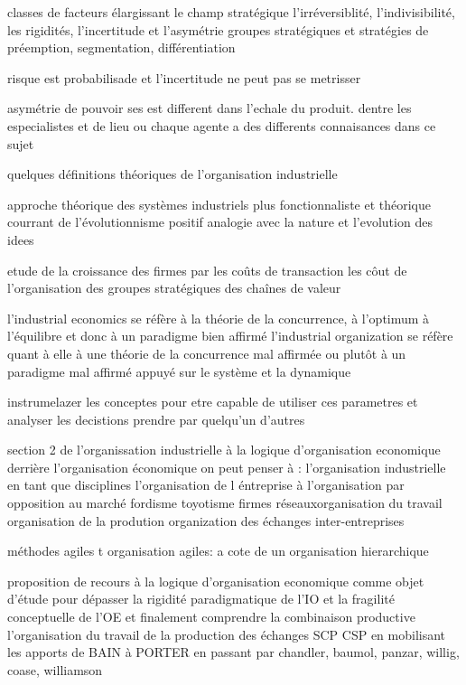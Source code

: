 \documentclass{article}
\begin{document}
classes de facteurs élargissant le champ stratégique l'irréversiblité, l'indivisibilité, les rigidités, l'incertitude et l'asymétrie groupes stratégiques et stratégies de préemption, segmentation, différentiation

risque est probabilisade et l'incertitude ne peut pas se metrisser 

asymétrie de pouvoir ses est different dans l'echale du produit. dentre les especialistes et de lieu ou chaque agente a des differents connaisances dans ce sujet

quelques définitions théoriques de l'organisation industrielle



approche théorique des systèmes industriels plus fonctionnaliste et théorique courrant de l'évolutionnisme positif
analogie avec la nature et l'evolution des idees


etude de la croissance des firmes par les coûts de transaction les côut de l'organisation des groupes stratégiques des chaînes de valeur


l'industrial economics se réfère à la théorie de la concurrence, à l'optimum à l'équilibre et donc à un paradigme bien affirmé
l'industrial organization se réfère quant à elle à une théorie de la concurrence mal affirmée ou plutôt à un paradigme mal affirmé appuyé sur le système et la dynamique

instrumelazer les conceptes pour etre capable de utiliser ces parametres et analyser les decistions prendre par quelqu'un d'autres


section 2
de l'organissation industrielle à la logique d'organisation economique
derrière l'organisation économique on peut penser à :
l'organisation industrielle en tant que disciplines
l'organisation de l éntreprise à l'organisation par opposition au marché
fordisme toyotisme firmes réseauxorganisation du travail 
organisation de la prodution 
organization des échanges inter-entreprises

méthodes agiles t organisation agiles: a cote de un organisation hierarchique

proposition de recours à la logique d'organisation economique comme objet d'étude pour dépasser la rigidité paradigmatique de l'IO et la fragilité conceptuelle de l'OE et finalement comprendre
    la combinaison productive
    l'organisation du travail de la production des échanges SCP CSP
en mobilisant les apports de BAIN à PORTER en passant par chandler, baumol, panzar, willig, coase, williamson
\end{document}
